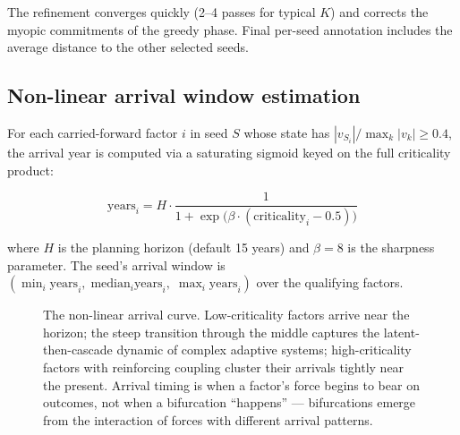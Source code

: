 \documentclass[11pt,a4paper]{article}
\begin{document}
The refinement converges quickly (2--4 passes for typical $K$) and corrects the myopic commitments of the greedy phase. Final per-seed annotation includes the average distance to the other selected seeds.

\subsection{Non-linear arrival window estimation}

For each carried-forward factor $i$ in seed $S$ whose state has $|v_{S_i}|/\max_k |v_k| \ge 0.4$, the arrival year is computed via a saturating sigmoid keyed on the full criticality product:

\begin{equation}
\text{years}_i = H \cdot \frac{1}{1 + \exp\big(\beta \cdot (\text{criticality}_i - 0.5)\big)}
\end{equation}

where $H$ is the planning horizon (default 15 years) and $\beta = 8$ is the sharpness parameter. The seed's arrival window is $(\min_i \text{years}_i, \; \text{median}_i \text{years}_i, \; \max_i \text{years}_i)$ over the qualifying factors.

\begin{figure}[H]
\centering
{}
\caption{The non-linear arrival curve. Low-criticality factors arrive near the horizon; the steep transition through the middle captures the latent-then-cascade dynamic of complex adaptive systems; high-criticality factors with reinforcing coupling cluster their arrivals tightly near the present. Arrival timing is when a factor's force begins to bear on outcomes, not when a bifurcation ``happens'' — bifurcations emerge from the interaction of forces with different arrival patterns.}
\end{figure}
\end{document}
